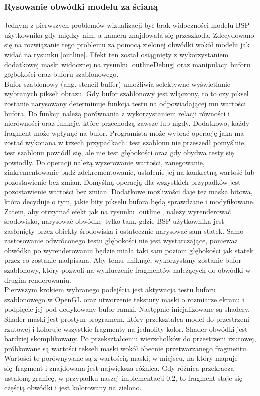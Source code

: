\subsubsection{Rysowanie obwódki modelu za ścianą}

Jednym z pierwszych problemów wizualizacji był brak widoczności modelu BSP użytkownika gdy między nim, a kamerą znajdowała się przeszkoda. Zdecydowano się na rozwiązanie tego problemu za pomocą zielonej obwódki wokół modelu jak widać na rysunku \ref{outline}. Efekt ten został osiągnięty z wykorzystaniem dodatkowej maski widocznej na rysunku \ref{outlineDebug} oraz manipulacji buforu głębokości oraz buforu szablonowego.
\\

Bufor szablonowy (ang. stencil buffer) umożliwia selektywne wyświetlanie wybranych pikseli obrazu. Gdy bufor szablonowy jest włączony, to to czy piksel zostanie narysowany determinuje funkcja testu na odpowiadającej mu wartości bufora. Do funkcji należą porównania z wykorzystaniem relacji równości i nierówności oraz funkcje, które przechodzą zawsze lub nigdy.
Dodatkowo, każdy fragment może wpłynąć na bufor. Programista może wybrać operację jaka ma zostać wykonana w trzech przypadkach: test szablonu nie przeszedł pomyślnie, test szablonu powiódł się, ale nie test głębokości oraz gdy obydwa testy się powiodły. Do operacji należą wyzerowanie wartości, zanegowanie, zinkrementowanie bądź zdekrementowanie, ustalenie jej na konkretną wartość lub pozostawienie bez zmian. Domyślną operacją dla wszystkich przypadków jest pozostawienie wartości bez zmian. Dodatkowe możliwości daje też maska bitowa, która decyduje o tym, jakie bity pikselu bufora będą sprawdzane i modyfikowane. 
\\

Zatem, aby otrzymać efekt jak na rysunku \ref{outline}, należy wyrenderować środowisko, narysować obwódkę tylko tam, gdzie BSP użytkownika jest zasłonięty przez obiekty środowiska i ostatecznie narysować sam statek. Samo zastosowanie odwróconego testu głębokości nie jest wystarczające, ponieważ obwódka po wyrenderowaniu będzie miała taki sam poziom głębokości jak statek przez co zostanie nadpisana. Aby temu uniknąć, wykorzystany zostanie bufor szablonowy, który pozwoli na wykluczenie fragmentów należących do obwódki w drugim renderowaniu.
\\

Pierwszym krokiem wybranego podejścia jest aktywacja testu buforu szablonowego w OpenGL oraz utworzenie tekstury maski o rozmiarze ekranu i podpięcie jej pod dedykowany bufor ramki. Następnie inicjalizowane są shadery. Shader maski jest prostym programem, który przekształca model do przestrzeni rzutowej i koloruje wszystkie fragmenty na jednolity kolor. Shader obwódki jest bardziej skomplikowany. Po przekształceniu wierzchołków do przestrzeni rzutowej, próbkowane są wartości tekseli maski wokół obecnie przetwarzanego fragmentu. Wartości te porównywane są z wartością maski, w miejscu, na który mapuje się fragment i znajdowana jest największa różnica. Gdy różnica przekracza ustaloną granicę, w przypadku naszej implementacji $0.2$, to fragment staje się częścią obwódki i jest kolorowany na zielono.
\\

